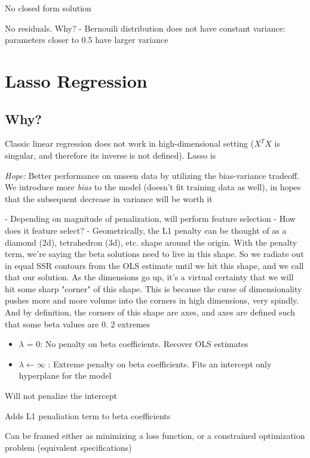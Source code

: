 \documentclass{article}
\begin{document}
No closed form solution

No residuals. Why?
	- Bernouili  distribution does not have constant variance: parameters closer to 0.5 have larger variance

\section{Lasso Regression}

\subsection{Why?}

Classic linear regression does not work in high-dimensional setting ($X^T X$ is singular, and therefore its inverse is not defined). Lasso is
	
\textit{Hope:} Better performance on unseen data by utilizing the bias-variance tradeoff. We introduce more \textit{bias} to the model (doesn't fit training data as well), in hopes that the subsequent decrease in variance will be worth it

	- Depending on magnitude of penalization, will perform feature selection
- How does it feature select?
	- Geometrically, the L1 penalty can be thought of as a diamond (2d), tetrahedron (3d), etc. shape around the origin. With the penalty term, we're saying the beta solutions need to live in this shape. So we radiate out in equal SSR contours from the OLS estimate until we hit this shape, and we call that our solution. As the dimensions go up, it's a virtual certainty that we will hit some sharp "corner" of this shape. This is because the curse of dimensionality pushes more and more volume into the corners in high dimensions, very spindly. And by definition, the corners of this shape are axes, and axes are defined such that some beta values are 0.
2 extremes
\begin{itemize}
	\item $\lambda$ = 0: No penalty on beta coefficients. Recover OLS estimates
	\item $\lambda \leftarrow \infty$ : Extreme penalty on beta coefficients. Fits an intercept only hyperplane for the model
\end{itemize}

Will not penalize the intercept

Adds L1 penaliation term to beta coefficients

Can be framed either as minimizing a loss function, or a constrained optimization problem (equivalent specifications)
\end{document}

